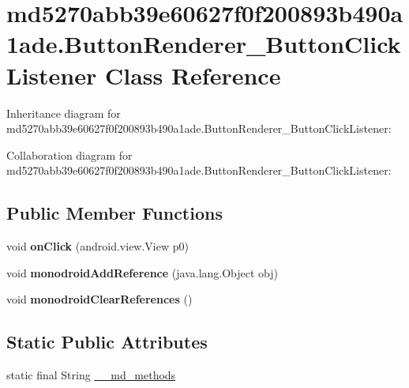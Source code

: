 \hypertarget{classmd5270abb39e60627f0f200893b490a1ade_1_1_button_renderer___button_click_listener}{}\section{md5270abb39e60627f0f200893b490a1ade.\+Button\+Renderer\+\_\+\+Button\+Click\+Listener Class Reference}
\label{classmd5270abb39e60627f0f200893b490a1ade_1_1_button_renderer___button_click_listener}


Inheritance diagram for md5270abb39e60627f0f200893b490a1ade.\+Button\+Renderer\+\_\+\+Button\+Click\+Listener\+:


Collaboration diagram for md5270abb39e60627f0f200893b490a1ade.\+Button\+Renderer\+\_\+\+Button\+Click\+Listener\+:
\subsection*{Public Member Functions}
\begin{DoxyCompactItemize}
\item 
\mbox{\label{classmd5270abb39e60627f0f200893b490a1ade_1_1_button_renderer___button_click_listener_a498d522f10f3d9a972aae4d52698573f}} 
void {\bfseries on\+Click} (android.\+view.\+View p0)
\item 
\mbox{\label{classmd5270abb39e60627f0f200893b490a1ade_1_1_button_renderer___button_click_listener_a86f4e14df96aec81f38a28a5d72f0edf}} 
void {\bfseries monodroid\+Add\+Reference} (java.\+lang.\+Object obj)
\item 
\mbox{\label{classmd5270abb39e60627f0f200893b490a1ade_1_1_button_renderer___button_click_listener_a3ad2ca4f3a271cf9d78dd0f3c022a69b}} 
void {\bfseries monodroid\+Clear\+References} ()
\end{DoxyCompactItemize}
\subsection*{Static Public Attributes}
\begin{DoxyCompactItemize}
\item 
static final String \hyperlink{classmd5270abb39e60627f0f200893b490a1ade_1_1_button_renderer___button_click_listener_acbb70b7781fb2d4c00834405eb00337a}{\+\_\+\+\_\+md\+\_\+methods}
\end{DoxyCompactItemize}


